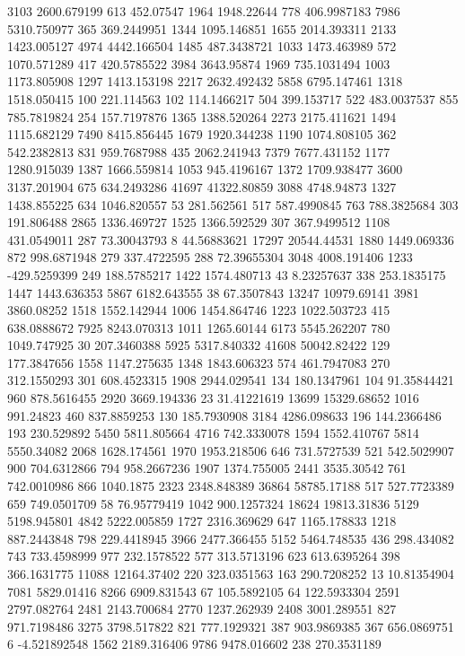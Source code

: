 3103	2600.679199
613	452.07547
1964	1948.22644
778	406.9987183
7986	5310.750977
365	369.2449951
1344	1095.146851
1655	2014.393311
2133	1423.005127
4974	4442.166504
1485	487.3438721
1033	1473.463989
572	1070.571289
417	420.5785522
3984	3643.95874
1969	735.1031494
1003	1173.805908
1297	1413.153198
2217	2632.492432
5858	6795.147461
1318	1518.050415
100	221.114563
102	114.1466217
504	399.153717
522	483.0037537
855	785.7819824
254	157.7197876
1365	1388.520264
2273	2175.411621
1494	1115.682129
7490	8415.856445
1679	1920.344238
1190	1074.808105
362	542.2382813
831	959.7687988
435	2062.241943
7379	7677.431152
1177	1280.915039
1387	1666.559814
1053	945.4196167
1372	1709.938477
3600	3137.201904
675	634.2493286
41697	41322.80859
3088	4748.94873
1327	1438.855225
634	1046.820557
53	281.562561
517	587.4990845
763	788.3825684
303	191.806488
2865	1336.469727
1525	1366.592529
307	367.9499512
1108	431.0549011
287	73.30043793
8	44.56883621
17297	20544.44531
1880	1449.069336
872	998.6871948
279	337.4722595
288	72.39655304
3048	4008.191406
1233	-429.5259399
249	188.5785217
1422	1574.480713
43	8.23257637
338	253.1835175
1447	1443.636353
5867	6182.643555
38	67.3507843
13247	10979.69141
3981	3860.08252
1518	1552.142944
1006	1454.864746
1223	1022.503723
415	638.0888672
7925	8243.070313
1011	1265.60144
6173	5545.262207
780	1049.747925
30	207.3460388
5925	5317.840332
41608	50042.82422
129	177.3847656
1558	1147.275635
1348	1843.606323
574	461.7947083
270	312.1550293
301	608.4523315
1908	2944.029541
134	180.1347961
104	91.35844421
960	878.5616455
2920	3669.194336
23	31.41221619
13699	15329.68652
1016	991.24823
460	837.8859253
130	185.7930908
3184	4286.098633
196	144.2366486
193	230.529892
5450	5811.805664
4716	742.3330078
1594	1552.410767
5814	5550.34082
2068	1628.174561
1970	1953.218506
646	731.5727539
521	542.5029907
900	704.6312866
794	958.2667236
1907	1374.755005
2441	3535.30542
761	742.0010986
866	1040.1875
2323	2348.848389
36864	58785.17188
517	527.7723389
659	749.0501709
58	76.95779419
1042	900.1257324
18624	19813.31836
5129	5198.945801
4842	5222.005859
1727	2316.369629
647	1165.178833
1218	887.2443848
798	229.4418945
3966	2477.366455
5152	5464.748535
436	298.434082
743	733.4598999
977	232.1578522
577	313.5713196
623	613.6395264
398	366.1631775
11088	12164.37402
220	323.0351563
163	290.7208252
13	10.81354904
7081	5829.01416
8266	6909.831543
67	105.5892105
64	122.5933304
2591	2797.082764
2481	2143.700684
2770	1237.262939
2408	3001.289551
827	971.7198486
3275	3798.517822
821	777.1929321
387	903.9869385
367	656.0869751
6	-4.521892548
1562	2189.316406
9786	9478.016602
238	270.3531189
